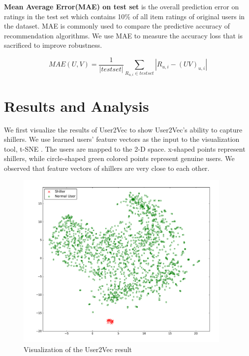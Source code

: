 \documentclass[master,english,final]{kaist-ucs}
\begin{document}
\textbf{Mean Average Error(MAE) on test set} is the overall prediction error on ratings in the test set which contains 10\% of all item ratings of original users in the dataset.
MAE is commonly used to compare the predictive accuracy of recommendation algorithms.
We use MAE to measure the accuracy loss that is sacrificed to improve robustness.

\begin{equation}
MAE(U,V) = \frac{1}{|test set|} \sum_{R_{u,i} \in test set} |R_{u,i}-(UV)_{u,i}|
\end{equation}



\section{Results and Analysis}
We first visualize the results of User2Vec to show User2Vec's ability to capture shillers.
We use learned users' feature vectors as the input to the visualization tool, t-SNE \cite{TSNE}.
The users are mapped to the 2-D space.
x-shaped points represent shillers, while circle-shaped green colored points represent genuine users.
We observed that feature vectors of shillers are very close to each other.
\begin{figure}[t]
    \centerline{\includegraphics[width=10.5cm]{figure/user2vec_result.pdf}}
    \caption{  Visualization of the User2Vec result } \label{user2vec_result}
\end{figure}

\end{document}
